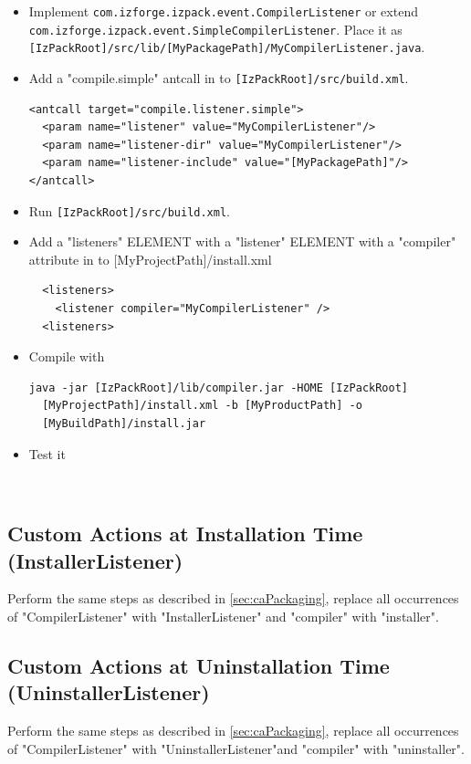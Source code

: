 \begin{itemize}
  \item Implement \texttt{com.izforge.izpack.event.CompilerListener} or
  extend \texttt{com.izforge.izpack.event.SimpleCompilerListener}.
  Place it as \texttt{[IzPackRoot]/src/lib/[MyPackagePath]/MyCompilerListener.java}.

  \item Add a "compile.simple" antcall in to \texttt{[IzPackRoot]/src/build.xml}.
\footnotesize
\begin{verbatim}
<antcall target="compile.listener.simple">
  <param name="listener" value="MyCompilerListener"/>
  <param name="listener-dir" value="MyCompilerListener"/>
  <param name="listener-include" value="[MyPackagePath]"/>
</antcall>
\end{verbatim}
\normalsize

  \item Run \texttt{[IzPackRoot]/src/build.xml}.

  \item Add a "listeners" ELEMENT with a "listener" ELEMENT with
  a "compiler" attribute in to [MyProjectPath]/install.xml
\footnotesize
\begin{verbatim}
  <listeners>
    <listener compiler="MyCompilerListener" />
  <listeners>
\end{verbatim}
\normalsize

  \item Compile with
\footnotesize
\begin{verbatim}
java -jar [IzPackRoot]/lib/compiler.jar -HOME [IzPackRoot]
  [MyProjectPath]/install.xml -b [MyProductPath] -o
  [MyBuildPath]/install.jar
\end{verbatim}
\normalsize

  \item Test it
\end{itemize}\

\subsection{Custom Actions at Installation Time (InstallerListener)}
Perform the same steps as described in \ref{sec:caPackaging}, replace
all occurrences of "CompilerListener" with "InstallerListener" and
"compiler" with "installer".

\subsection{Custom Actions at Uninstallation Time
(UninstallerListener)} Perform the same steps as described in
\ref{sec:caPackaging}, replace all occurrences of
"CompilerListener" with "UninstallerListener"and "compiler" with
"uninstaller".

